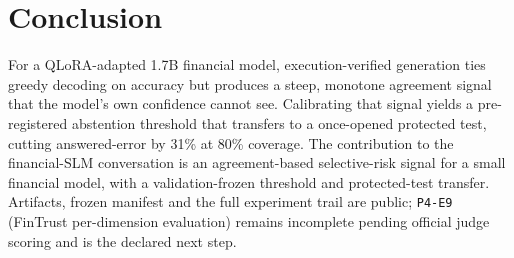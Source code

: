 \documentclass[conference]{IEEEtran}
\begin{document}
\section{Conclusion}
For a QLoRA-adapted 1.7B financial model, execution-verified generation ties greedy decoding
on accuracy but produces a steep, monotone agreement signal that the model's own confidence
cannot see. Calibrating that signal yields a pre-registered abstention threshold that
transfers to a once-opened protected test, cutting answered-error by 31\% at 80\% coverage.
The contribution to the financial-SLM conversation is an agreement-based selective-risk
signal for a small financial model, with a validation-frozen threshold and protected-test
transfer. Artifacts, frozen manifest and the full experiment trail are public; \texttt{P4-E9}
(FinTrust per-dimension evaluation) remains incomplete pending official judge scoring and is
the declared next step.
\end{document}
